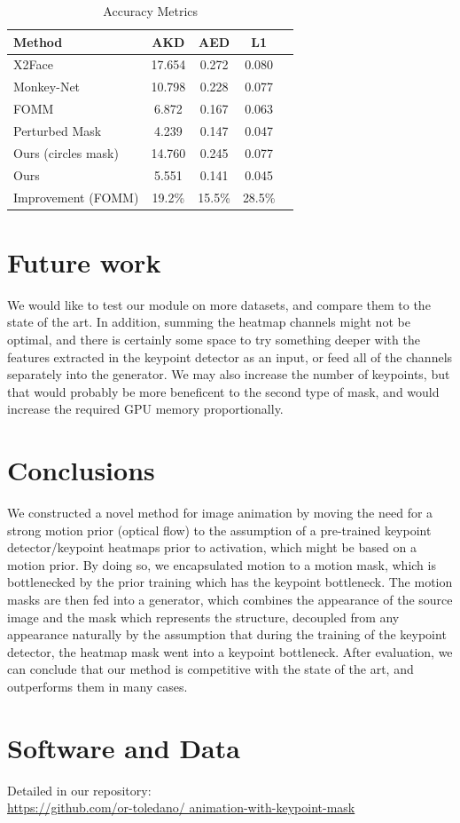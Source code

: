 \documentclass{article}
\begin{document}

\begin{table}[t]
\caption{Accuracy Metrics}
\label{table:results}
\vskip 0.15in
\begin{center}
\begin{small}
\begin{sc}
\begin{tabular}{lcccr}
\toprule
Method & AKD & AED & L1 \\
\midrule
X2Face    & 17.654 & 0.272 & 0.080 \\
Monkey-Net    & 10.798 & 0.228 & 0.077 \\
FOMM    & 6.872 & 0.167 & 0.063 \\
Perturbed Mask & 4.239 & 0.147 & 0.047 \\
Ours (circles mask) & 14.760& 0.245 & 0.077 \\
Ours & 5.551 & 0.141 &  0.045\\
\midrule
Improvement (FOMM)    & 19.2\% & 15.5\% & 28.5\% \\
\bottomrule
\end{tabular}
\end{sc}
\end{small}
\end{center}
\vskip -0.1in
\end{table}
\section{Future work}
We would like to test our module on more datasets, and compare them to the
state of the art. In addition, summing the heatmap channels might not be
optimal, and there is certainly some space to try something deeper with the
features extracted in the keypoint detector as an input, or feed all of the
channels separately into the generator.
We may also increase the number of keypoints, but that would probably be
more beneficent to the second type of mask, and would increase the
required GPU memory proportionally.

\section{Conclusions}
We constructed a novel method for image animation by moving the need for
a strong motion prior (optical flow) to the assumption of a pre-trained
keypoint detector/keypoint heatmaps prior to activation, which might be
based on a motion prior.
By doing so, we encapsulated motion to a motion mask, which is
bottlenecked by the prior training which has the keypoint bottleneck.
The motion masks are then fed into a generator, which combines the
appearance of the source image and the mask which represents the structure,
decoupled from any appearance naturally by the assumption that during the
training of the keypoint detector, the heatmap mask went into a keypoint
bottleneck. After evaluation, we can conclude that our method is
competitive with the state of the art, and outperforms them in many cases.
\section*{Software and Data}
Detailed in our repository:
\\
\url{https://github.com/or-toledano/
animation-with-keypoint-mask}


\end{document}
